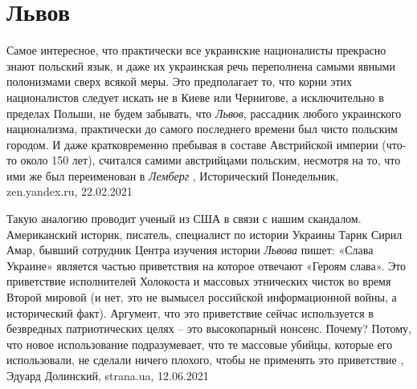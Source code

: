  
 
 
 
 
\chapter{Львов}
\label{sec:slova.lvov}

Самое интересное, что практически все украинские националисты прекрасно знают
польский язык, и даже их украинская речь переполнена самыми явными полонизмами
сверх всякой меры. Это предполагает то, что корни этих националистов следует
искать не в Киеве или Чернигове, а исключительно в пределах Польши, не будем
забывать, что \emph{Львов}, рассадник любого украинского национализма, практически до
самого последнего времени был чисто польским городом. И даже кратковременно
пребывая в составе Австрийской империи (что-то около 150 лет), считался самими
австрийцами польским, несмотря на то, что ими же был переименован в \emph{Лемберг}
, 
Исторический Понедельник, zen.yandex.ru, 22.02.2021 

Такую аналогию проводит ученый из США в связи с нашим скандалом.  Американский
историк, писатель, специалист по истории Украины Тарик Сирил Амар, бывший
сотрудник Центра изучения истории \emph{Львова} пишет: «Слава Украине» является
частью приветствия на которое отвечают «Героям слава». Это приветствие
исполнителей Холокоста и массовых этнических чисток во время Второй мировой (и
нет, это не вымысел российской информационной войны, а исторический факт).
Аргумент, что это приветствие сейчас используется в безвредных патриотических
целях – это высокопарный нонсенс. Почему? Потому, что новое использование
подразумевает, что те массовые убийцы, которые его использовали, не сделали
ничего плохого, чтобы не применять это приветствие
, 
Эдуард Долинский, strana.ua, 12.06.2021

